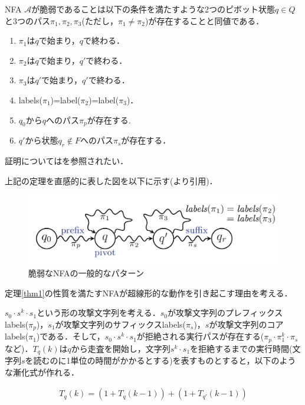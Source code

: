 \documentclass[a4paper, 12pt, dvipdfmx, uplatex]{jsreport}
\begin{document}
\begin{thm}\label{thm1}
  NFA $\mathcal{A}$が脆弱であることは以下の条件を満たすような2つのピボット状態$q\in Q$と3つのパス$\pi_1,\pi_2,\pi_3$(ただし，$\pi_1 \neq \pi_2$)が存在することと同値である．
    \begin{enumerate}
      \item $\pi_1$は$q$で始まり，$q$で終わる．
      \item $\pi_2$は$q$で始まり，$q'$で終わる．
      \item $\pi_3$は$q'$で始まり，$q'$で終わる．
      \item labels($\pi_1$)=label($\pi_2$)=label($\pi_3$)．
      \item $q_0$から$q$へのパス$\pi_p$が存在する.
      \item $q'$から状態$q_r \notin F$へのパス$\pi_s$が存在する．
    \end{enumerate}
\end{thm}
証明については\cite{vul_detect}を参照されたい．

上記の定理を直感的に表した図を以下に示す(\cite{vul_detect}より引用)．
\begin{figure}[H] %
  \centering
  \includegraphics[width=\linewidth]{../figures/vul.jpg}
  \caption{脆弱なNFAの一般的なパターン\label{vul_nfa}}
\end{figure}

定理\ref{thm1}の性質を満たすNFAが超線形的な動作を引き起こす理由を考える．

$s_0\cdot s^k\cdot s_1$という形の攻撃文字列を考える．$s_0$が攻撃文字列のプレフィックスlabels($\pi_p$)，$s_1$が攻撃文字列のサフィックスlabels($\pi_s$)，$s$が攻撃文字列のコアlabels($\pi_1$)である．そして，$s_0\cdot s^k\cdot s_1$が拒絶される実行パスが存在する($\pi_p \cdot \pi_1^k \cdot \pi_s$など)．$T_q(k)$は$q$から走査を開始し，文字列$s^k\cdot s_1$を拒絶するまでの実行時間(文字列$s$を読むのに1単位の時間がかかるとする)を表すものとすると，以下のような漸化式が作れる．

\begin{align}
  T_q(k)=(1+T_q(k-1))+(1+T_{q'}(k-1))\label{tq}
\end{align}
\end{document}

